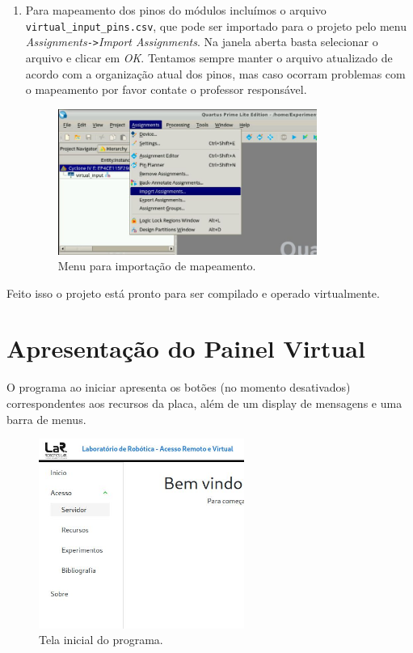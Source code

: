 \documentclass[12pt]{article}
\begin{document}
\begin{enumerate}[font=\bfseries]
    \item Para mapeamento dos pinos do módulos incluímos o arquivo \verb|virtual_input_pins.csv|, que pode ser importado para o projeto pelo menu \textit{Assignments}\verb|->|\textit{Import Assignments}. Na janela aberta basta selecionar o arquivo e clicar em \textit{OK}. Tentamos sempre manter o arquivo atualizado de acordo com a organização atual dos pinos, mas caso ocorram problemas com o mapeamento por favor contate o professor responsável.
    
    \begin{figure}[H]
    \centering
    \includegraphics[width=0.8\textwidth]{img/pins-quartus.jpg}
    \caption{\label{ref:pins-quartus}Menu para importação de mapeamento.}
    \end{figure}
    
\end{enumerate}
Feito isso o projeto está pronto para ser compilado e operado virtualmente.

\section{Apresentação do Painel Virtual}
O programa ao iniciar apresenta os botões (no momento desativados) correspondentes aos recursos da placa, além de um display de mensagens e uma barra de menus.

\begin{figure}[H]
    \centering
    \includegraphics[width=0.6\textwidth]{img/site-lar.jpg}
    \caption{\label{ref:fig1}Tela inicial do programa.}
\end{figure}
\end{document}
